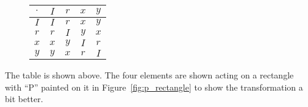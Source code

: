 \documentclass[../gatm_answers.tex]{subfiles}
\begin{document}
\begin{figure}[h]
	\begin{center}
		\begin{minipage}[b]{\textwidth}
			\centering
			\begin{tabular}{c|cccc}
				\hline
				$\cdot$ & $I$ & $r$ & $x$ & $y$ \\ \hline
				\rowcolor{light-gray}
				$I$ & $I$ & $r$ & $x$ & $y$ \\
				$r$ & $r$ & $I$ & $y$ & $x$ \\
				\rowcolor{light-gray}
				$x$ & $x$ & $y$ & $I$ & $r$ \\
				$y$ & $y$ & $x$ & $r$ & $I$ \\ \hline
			\end{tabular}
			\vspace*{0.5\baselineskip}
		\end{minipage}
	\end{center}
	\vspace*{-\baselineskip}%
\end{figure}

\noindent The table is shown above. The four elements are shown acting on a rectangle with ``P'' painted on it in Figure~\ref{fig:p_rectangle} to show the transformation a bit better.
\end{document}
